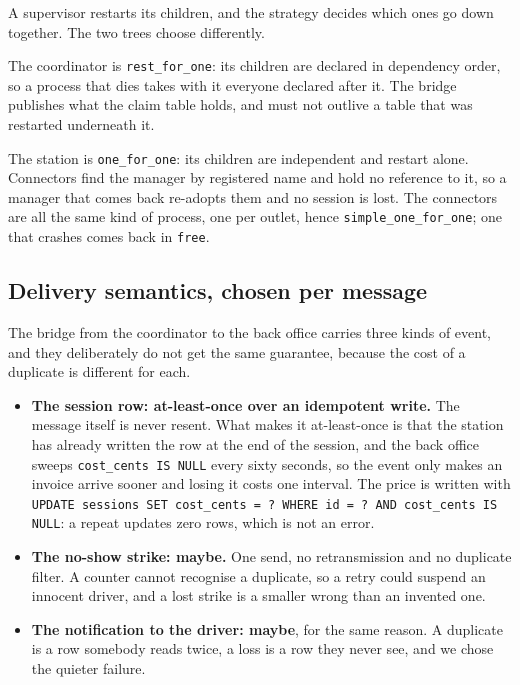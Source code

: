 A supervisor restarts its children, and the strategy decides which ones go down
together. The two trees choose differently.

The coordinator is \texttt{rest\_for\_one}: its children are declared in
dependency order, so a process that dies takes with it everyone declared after
it. The bridge publishes what the claim table holds, and must not outlive a table
that was restarted underneath it.

The station is \texttt{one\_for\_one}: its children are independent and restart
alone. Connectors find the manager by registered name and hold no reference to
it, so a manager that comes back re-adopts them and no session is lost. The
connectors are all the same kind of process, one per outlet, hence
\texttt{simple\_one\_for\_one}; one that crashes comes back in \texttt{free}.

\subsection{Delivery semantics, chosen per message}
\label{sec:guarantees}

The bridge from the coordinator to the back office carries three kinds of event,
and they deliberately do not get the same guarantee, because the cost of a
duplicate is different for each.

\begin{itemize}
  \item \textbf{The session row: at-least-once over an idempotent write.} The
        message itself is never resent. What makes it at-least-once is that the
        station has already written the row at the end of the session, and the
        back office sweeps \texttt{cost\_cents IS NULL} every sixty seconds, so
        the event only makes an invoice arrive sooner and losing it costs one
        interval. The price is written with \texttt{UPDATE sessions SET
        cost\_cents = ? WHERE id = ? AND cost\_cents IS NULL}: a repeat updates
        zero rows, which is not an error.
  \item \textbf{The no-show strike: maybe.} One send, no retransmission and no
        duplicate filter. A counter cannot recognise a duplicate, so a retry
        could suspend an innocent driver, and a lost strike is a smaller wrong
        than an invented one.
  \item \textbf{The notification to the driver: maybe}, for the same reason. A duplicate is a
        row somebody reads twice, a loss is a row they never see, and we chose
        the quieter failure.
\end{itemize}

